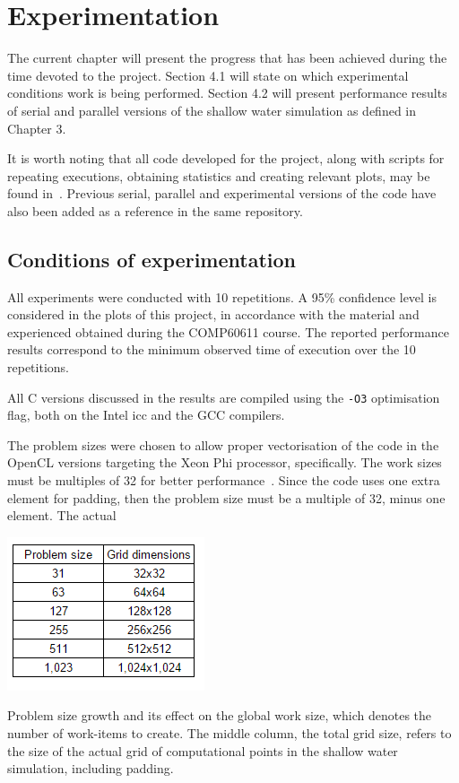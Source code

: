 \chapter{Experimentation}
\label{cha:exp2}

The current chapter will present the progress that has been achieved during the time devoted to the project. Section 4.1 will state on which experimental conditions work is being performed. Section 4.2 will present performance results of serial and parallel versions of the shallow water simulation as defined in Chapter 3.

It is worth noting that all code developed for the project, along with scripts for repeating executions, obtaining statistics and creating relevant plots, may be found in~\cite{arturo_isai_castro_perpuli_2015_16985}. Previous serial, parallel and experimental versions of the code have also been added as a reference in the same repository.

\section{Conditions of experimentation}

All experiments were conducted with 10 repetitions. A 95\% confidence level is considered in the plots of this project, in accordance with the material and experienced obtained during the COMP60611 course. The reported performance results correspond to the minimum observed time of execution over the 10 repetitions.

All C versions discussed in the results are compiled using the \texttt{-O3} optimisation flag, both on the Intel icc and the GCC compilers.

The problem sizes were chosen to allow proper vectorisation of the code in the OpenCL versions targeting the Xeon Phi processor, specifically. The work sizes must be multiples of 32 for better performance~\cite{Intel2014}. Since the code uses one extra element for padding, then the problem size must be a multiple of 32, minus one element. The actual 

\begin{table}[!ht]
\begin{center}
\centerline{\includegraphics{img/padding}}
\caption[Problem size growth and its effect on the global work size.]{Problem size growth and its effect on the global work size, which denotes the number of work-items to create. The middle column, the total grid size, refers to the size of the actual grid of computational points in the shallow water simulation, including padding.}
\label{t:problemsize}
\end{center}
\end{table}

